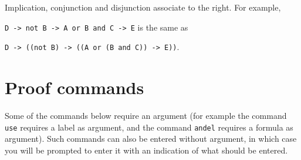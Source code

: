 \documentclass[12pt]{article}
\begin{document}
Implication, conjunction and disjunction associate to the right.
For example,  

\verb|D -> not B -> A or B and C -> E| \qquad is the same as
 
\verb|D -> ((not B) -> ((A or (B and C)) -> E))|.          




\section{Proof commands}
\label{sec-proof}

Some of the commands below require an argument 
(for example the command \verb|use| requires a label as argument,
and the command \verb|andel| requires a formula as argument).
Such commands can also be entered without argument,
in which case you will be prompted to enter it 
with an indication of what should be entered.
\end{document}

